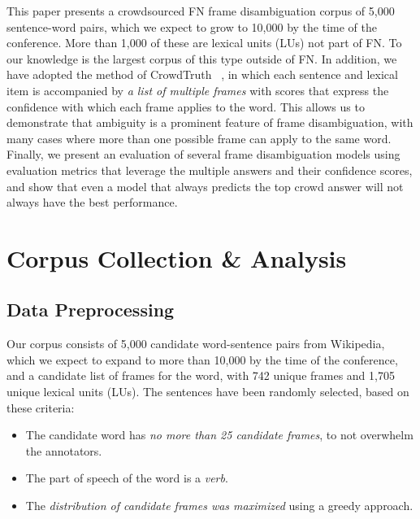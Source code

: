 This paper presents a crowdsourced FN frame disambiguation corpus of 5,000 sentence-word pairs, which we expect to grow to 10,000 by the time of the conference. More than 1,000 of these are lexical units (LUs) not part of FN. To our knowledge is the largest corpus of this type outside of FN. In addition, we have adopted the method of CrowdTruth ~\cite{aroyo2014threesides}, in which each sentence and lexical item is accompanied by \emph{a list of multiple frames} with scores that express the confidence with which each frame applies to the word. This allows us to demonstrate that ambiguity is a prominent feature of frame disambiguation, with many cases where more than one possible frame can apply to the same word. Finally, we present an evaluation of several frame disambiguation models using evaluation metrics that leverage the multiple answers and their confidence scores, and show that even a model that always predicts the top crowd answer will not always have the best performance.


\section{Corpus Collection \& Analysis}
\label{sec:corpus}

\subsection{Data Preprocessing}

Our corpus consists of 5,000 candidate word-sentence pairs from Wikipedia, which we expect to expand to more than 10,000 by the time of the conference, and a candidate list of frames for the word, with 742 unique frames and 1,705 unique lexical units (LUs). The sentences have been randomly selected, based on these criteria:

\begin{itemize}%
    \item The candidate word has \textit{no more than 25 candidate frames}, to not overwhelm the annotators.
    \item The part of speech of the word is a \textit{verb}.
    \item The \textit{distribution of candidate frames was maximized} using a greedy approach.
\end{itemize}

